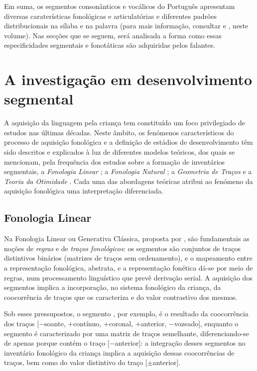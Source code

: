 \documentclass[output=paper]{LSP/langsci}
\begin{document}
Em suma, os segmentos consonânticos e vocálicos do Português apresentam diversas caraterísticas fonológicas e articulatórias e diferentes padrões distribucionais na sílaba e na palavra (para mais informação, consultar \citet{freitas2017} e \citet{santos2017}, neste volume). Nas secções que se seguem, será analisada a forma como essas especificidades segmentais e fonotáticas são adquiridas pelos falantes.

\section{A investigação em desenvolvimento segmental}
\label{sec:matzenauer_investigacao}

A aquisição da linguagem pela criança tem constituído um foco privilegiado de estudos nas últimas décadas. Neste âmbito, os fenómenos característicos do processo de aquisição fonológica e a definição de estádios de desenvolvimento têm sido descritos e explicados à luz de diferentes modelos teóricos, dos quais se mencionam, pela frequência dos estudos sobre a formação de inventários segmentais, a \textit{Fonologia Linear} \citep{chomskyhalle1968}; a \textit{Fonologia Natural} \citep{stampe1973}; a \textit{Geometria de Traços} \citep{clements1985,clementshume1995} e a \textit{Teoria da Otimidade} \citep{princesmolensky1993,mccarthyprince93}. Cada uma das abordagens teóricas atribui ao fenómeno da aquisição fonológica uma interpretação diferenciada.

\subsection{Fonologia Linear \citep{chomskyhalle1968}}
\label{subsec:matzenauer_linear}

Na Fonologia Linear ou Generativa Clássica, proposta por \citet{chomskyhalle1968}, são
fundamentais as noções de \textit{regras} e de \textit{traços fonológicos}: os segmentos são conjuntos de traços distintivos binários (matrizes de traços sem ordenamento), e o mapeamento entre a representação fonológica, abstrata, e a representação fonética dá-se por meio de regras, num processamento linguístico que prevê derivação serial. A aquisição dos segmentos implica a incorporação, no sistema fonológico da criança, da coocorrência de traços que os caracteriza e do valor contrastivo dos mesmos.

Sob esses pressupostos, o segmento , por exemplo, é o resultado da coocorrência dos traços [$-$soante, $+$contínuo, $+$coronal, $+$anterior, $-$vozeado], enquanto o segmento  é caracterizado por uma matriz de traços semelhante, diferenciando-se de  apenas porque contém o traço [$-$anterior]: a integração desses segmentos no inventário fonológico da criança implica a aquisição dessas coocorrências de traços, bem como do valor distintivo do traço [$\pm$anterior].
\end{document}
